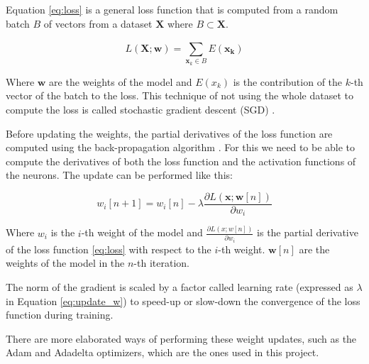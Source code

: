 Equation \eqref{eq:loss} is a general loss function that is computed from a random batch $B$ of vectors from a dataset $\mathbf{X}$ where $B \subset \mathbf{X}$.

\begin{equation}
    L(\mathbf{X}; \mathbf{w}) = \sum_{\mathbf{x}_k \in B}^{} E (\mathbf{x_k})
    \label{eq:loss}
\end{equation}

Where $\mathbf{w}$ are the weights of the model and $E(x_k)$ is the contribution of the $k$-th vector of the batch to the loss. This technique of not using the whole dataset to compute the loss is called stochastic gradient descent (SGD) \cite{bottou2010large}.

Before updating the weights, the partial derivatives of the loss function are computed using the back-propagation algorithm \cite{chauvin1995backpropagation}. For this we need to be able to compute the derivatives of both the loss function and the activation functions of the neurons. The update can be performed like this:

\begin{equation}
    w_i[n+1] = w_i[n] - \lambda \frac{\partial L(\mathbf{x}; \mathbf{w}[n])}{\partial w_i}
    \label{eq:update_w}
\end{equation}

Where $w_i$ is the $i$-th weight of the model and $\frac{\partial L(x; w[n])}{\partial w_i}$ is the partial derivative of the loss function \eqref{eq:loss} with respect to the $i$-th weight. $\mathbf{w}[n]$ are the weights of the model in the $n$-th iteration.

The norm of the gradient is scaled by a factor called learning rate (expressed as $\lambda$ in Equation \eqref{eq:update_w}) to speed-up or slow-down the convergence of the loss function during training.

There are more elaborated ways of performing these weight updates, such as the Adam \cite{kingma2014adam} and Adadelta \cite{zeiler2012adadelta} optimizers, which are the ones used in this project.


